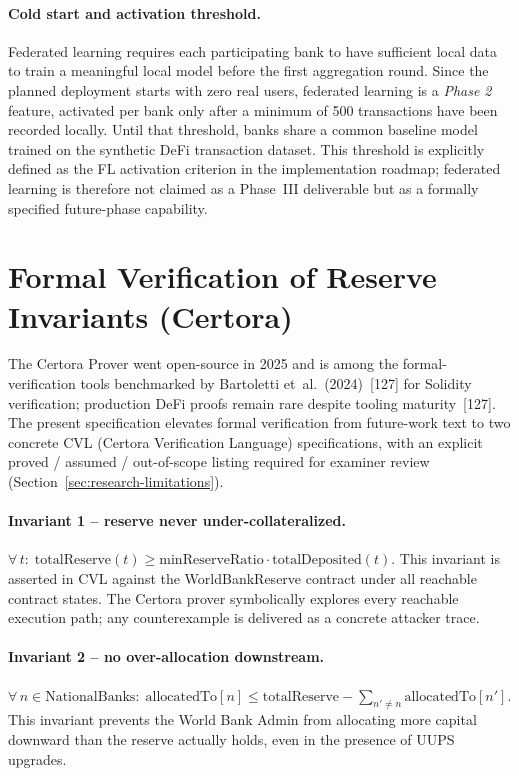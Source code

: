 \documentclass[12pt,a4paper]{report}
\begin{document}
\paragraph{Cold start and activation threshold.}
Federated learning requires each participating bank to have sufficient local data to train a meaningful local model before the first aggregation round. Since the planned deployment starts with zero real users, federated learning is a \textit{Phase 2} feature, activated per bank only after a minimum of 500 transactions have been recorded locally. Until that threshold, banks share a common baseline model trained on the synthetic DeFi transaction dataset. This threshold is explicitly defined as the FL activation criterion in the implementation roadmap; federated learning is therefore not claimed as a Phase~III deliverable but as a formally specified future-phase capability.

\section{Formal Verification of Reserve Invariants (Certora)}
\label{sec:certora}

The Certora Prover went open-source in 2025 and is among the formal-verification tools benchmarked by Bartoletti et~al.~(2024)~[127] for Solidity verification; production DeFi proofs remain rare despite tooling maturity~[127]. The present specification elevates formal verification from future-work text to two concrete CVL (Certora Verification Language) specifications, with an explicit proved / assumed / out-of-scope listing required for examiner review (Section~\ref{sec:research-limitations}).

\paragraph{Invariant 1 -- reserve never under-collateralized.}
\(\forall\, t:\; \mathrm{totalReserve}(t) \ge \mathrm{minReserveRatio} \cdot \mathrm{totalDeposited}(t).\)
This invariant is asserted in CVL against the WorldBankReserve contract under all reachable contract states. The Certora prover symbolically explores every reachable execution path; any counterexample is delivered as a concrete attacker trace.

\paragraph{Invariant 2 -- no over-allocation downstream.}
\(\forall\, n \in \mathrm{NationalBanks}:\; \mathrm{allocatedTo}[n] \le \mathrm{totalReserve} - \sum_{n' \ne n} \mathrm{allocatedTo}[n'].\)
This invariant prevents the World Bank Admin from allocating more capital downward than the reserve actually holds, even in the presence of UUPS upgrades.
\end{document}

